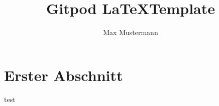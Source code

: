 \documentclass{scrartcl}
\title{Gitpod \LaTeX Template}
\author{Max Mustermann}
\begin{document}
    \maketitle
    
    \section{Erster Abschnitt}
    test
\end{document}
